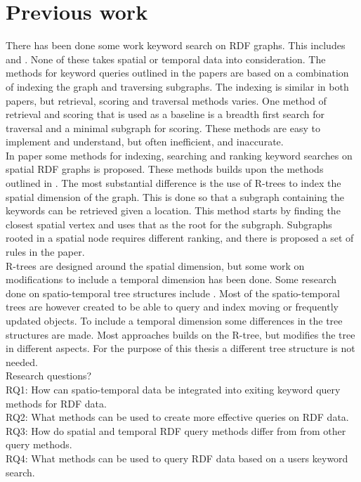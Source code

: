 \section{Previous work}
There has been done some work keyword search on RDF graphs. This includes \cite{4812421} and \cite{Elbassuoni:2011:KSO:2063576.2063615}. None of these takes spatial or temporal data into consideration. The methods for keyword queries outlined in the papers are based on a combination of indexing the graph and traversing subgraphs. The indexing is similar in both papers, but retrieval, scoring and traversal methods varies. One method of retrieval and scoring that is used as a baseline is a breadth first search for traversal and a minimal subgraph for scoring. These methods are easy to implement and understand, but often inefficient, and inaccurate.\\

In paper \cite{Shi:2016:TRS:2882903.2882941} some methods for indexing, searching and ranking keyword searches on spatial RDF graphs is proposed. These methods builds upon the methods outlined in \cite{4812421, Elbassuoni:2011:KSO:2063576.2063615}. The most substantial difference is the use of R-trees to index the spatial dimension of the graph. This is done so that a subgraph containing the keywords can be retrieved given a location. This method starts by finding the closest spatial vertex and uses that as the root for the subgraph. Subgraphs rooted in a spatial node requires different ranking, and there is proposed a set of rules in the paper.\\

R-trees are designed around the spatial dimension, but some work on modifications to include a temporal dimension has been done. Some research done on spatio-temporal tree structures include \cite{Tao:2003:TOS:1315451.1315519, r-tree-spatio-temporal}. Most of the spatio-temporal trees are however created to be able to query and index moving or frequently updated objects. To include a temporal dimension some differences in the tree structures are made. Most approaches builds on the R-tree, but modifies the tree in different aspects. For the purpose of this thesis a different tree structure is not needed.\\ %


Research questions?\\
RQ1: How can spatio-temporal data be integrated into exiting keyword query methods for RDF data.\\
RQ2: What methods can be used to create more effective queries on RDF data.\\
RQ3: How do spatial and temporal RDF query methods differ from from other query methods.\\
RQ4: What methods can be used to query RDF data based on a users keyword search.\\

\clearpage